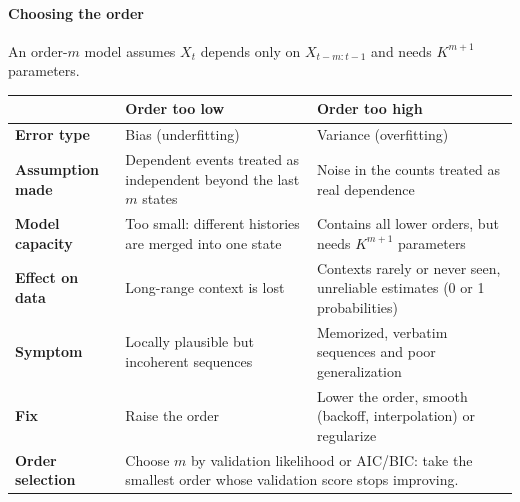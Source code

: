 \paragraph{Choosing the order}
An order-$m$ model assumes $X_{t}$ depends only on $X_{t-m:t-1}$ and needs $K^{m+1}$ parameters.
\begin{center}
\begin{tabularx}{\textwidth}{|l|X|X|}
    \hline
    & \textbf{Order too low} & \textbf{Order too high} \\
    \hline
    \textbf{Error type} & Bias (underfitting) & Variance (overfitting) \\
    \hline
    \textbf{Assumption made} & Dependent events treated as independent beyond the last $m$ states
        & Noise in the counts treated as real dependence \\
    \hline
    \textbf{Model capacity} & Too small: different histories are merged into one state
        & Contains all lower orders, but needs $K^{m+1}$ parameters \\
    \hline
    \textbf{Effect on data} & Long-range context is lost
        & Contexts rarely or never seen, unreliable estimates (0 or 1 probabilities) \\
    \hline
    \textbf{Symptom} & Locally plausible but incoherent sequences
        & Memorized, verbatim sequences and poor generalization \\
    \hline
    \textbf{Fix} & Raise the order
        & Lower the order, smooth (backoff, interpolation) or regularize \\
    \hline
    \textbf{Order selection} & \multicolumn{2}{X|}{Choose $m$ by validation likelihood or AIC/BIC:
        take the smallest order whose validation score stops improving.} \\
    \hline
\end{tabularx}
\end{center}

